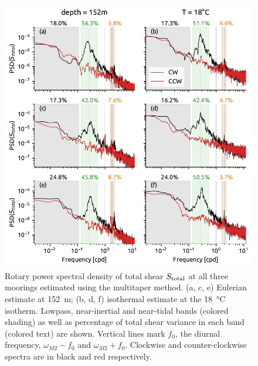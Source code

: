 \documentclass[onecol]{ametsoc}
\begin{document}
\begin{figure}
\centering
\includegraphics[width=39pc]{figure4-nrl-spectra.pdf}
\caption{\label{fig:nrlspectra}
Rotary power spectral density of total shear \(S_\text{total}\) at all three moorings estimated using the multitaper method. (a, c, e) Eulerian estimate at \SI{152}{m}; (b, d, f) isothermal estimate at the \SI{18}{\celsius} isotherm. Lowpass, near-inertial and near-tidal bands (colored shading) as well as percentage of total shear variance in each band (colored text) are shown. Vertical lines mark \(f_0\), the diurnal frequency, \(ω_{M2} - f_0\) and \(ω_{M2} + f_0\). Clockwise and counter-clockwise spectra are in black and red respectively.}
\end{figure}
\end{document}
